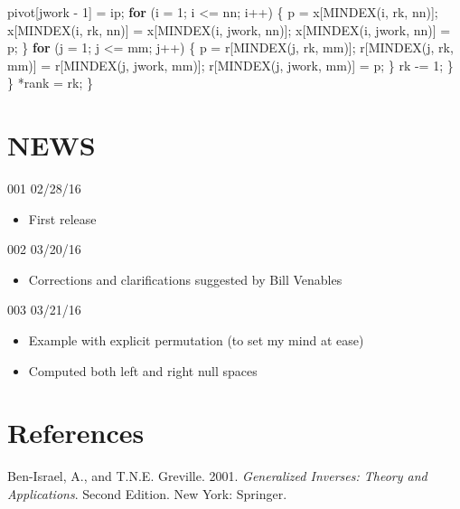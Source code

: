 \documentclass[12pt,]{article}
\newenvironment{Shaded}{\begin{snugshade}}{\end{snugshade}}
\newcommand{\DecValTok}[1]{\textcolor[rgb]{0.00,0.00,0.81}{#1}}
\newcommand{\ControlFlowTok}[1]{\textcolor[rgb]{0.13,0.29,0.53}{\textbf{#1}}}
\newcommand{\NormalTok}[1]{#1}
\providecommand{\tightlist}{%
  \setlength{\itemsep}{0pt}\setlength{\parskip}{0pt}}
\begin{document}
\begin{Shaded}
\begin{Highlighting}[]
\NormalTok{      pivot[jwork - }\DecValTok{1}\NormalTok{] = ip;}
      \ControlFlowTok{for}\NormalTok{ (i = }\DecValTok{1}\NormalTok{; i <= nn; i++) \{}
\NormalTok{        p = x[MINDEX(i, rk, nn)];}
\NormalTok{        x[MINDEX(i, rk, nn)] = x[MINDEX(i, jwork, nn)];}
\NormalTok{        x[MINDEX(i, jwork, nn)] = p;}
\NormalTok{      \}}
      \ControlFlowTok{for}\NormalTok{ (j = }\DecValTok{1}\NormalTok{; j <= mm; j++) \{}
\NormalTok{        p = r[MINDEX(j, rk, mm)];}
\NormalTok{        r[MINDEX(j, rk, mm)] = r[MINDEX(j, jwork, mm)];}
\NormalTok{        r[MINDEX(j, jwork, mm)] = p;}
\NormalTok{      \}}
\NormalTok{      rk -= }\DecValTok{1}\NormalTok{;}
\NormalTok{    \}}
\NormalTok{  \}}
\NormalTok{  *rank = rk;}
\NormalTok{\}}
\end{Highlighting}
\end{Shaded}

\section{NEWS}\label{news}

001 02/28/16

\begin{itemize}
\tightlist
\item
  First release
\end{itemize}

002 03/20/16

\begin{itemize}
\tightlist
\item
  Corrections and clarifications suggested by Bill Venables
\end{itemize}

003 03/21/16

\begin{itemize}
\tightlist
\item
  Example with explicit permutation (to set my mind at ease)
\item
  Computed both left and right null spaces
\end{itemize}

\section*{References}\label{references}

\hypertarget{refs}{}
\hypertarget{ref-benisrael_greville_01}{}
Ben-Israel, A., and T.N.E. Greville. 2001. \emph{Generalized Inverses:
Theory and Applications}. Second Edition. New York: Springer.
\end{document}
